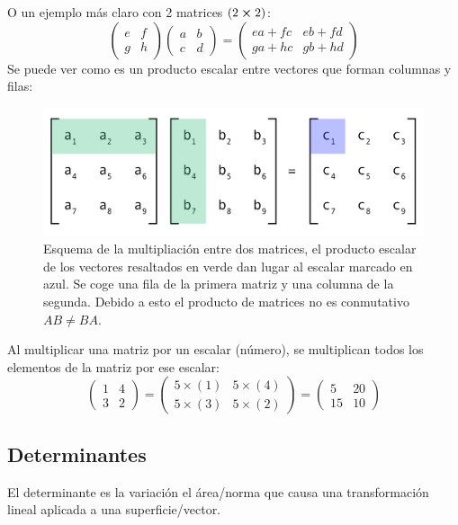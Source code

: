 \documentclass[arial,a4paper,print]{article}
\begin{document}
O un ejemplo más claro con 2 matrices $(2\cross2)$:
\begin{equation*}
	\begin{pmatrix}
		e & f \\
		g & h
	\end{pmatrix}\begin{pmatrix}
		a & b \\
		c & d
	\end{pmatrix}
	=
	\begin{pmatrix}
		ea + fc & eb + fd\\
		ga + hc & gb + hd
	\end{pmatrix}
\end{equation*}
Se puede ver como es un producto escalar entre vectores que forman columnas y filas:
\begin{figure}[h]
	\centering
	\includegraphics[width=0.5\linewidth]{figures/producto_matrices}
	\caption{Esquema de la multipliación entre dos matrices, el producto escalar de los vectores resaltados en verde dan lugar al escalar marcado en azul. Se coge una fila de la primera matriz y una columna de la segunda. Debido a esto el producto de matrices no es conmutativo $AB\neq BA$.}
	\label{fig:productomatrices}
\end{figure}


Al multiplicar una matriz por un escalar (número), se multiplican todos los elementos de la matriz por ese escalar:
\begin{equation*}
	\begin{pmatrix}
		1 & 4  \\
		3 & 2
	\end{pmatrix}
	=
	\begin{pmatrix}
		5 \times (1) & 5\times (4)  \\
		5\times (3) & 5\times (2) 
	\end{pmatrix}
	=
	\begin{pmatrix}
		5 & 20  \\
		15 & 10
	\end{pmatrix}
\end{equation*}

\subsection{Determinantes}
El determinante es la variación el área/norma que causa una transformación lineal aplicada a una superficie/vector.
\end{document}
